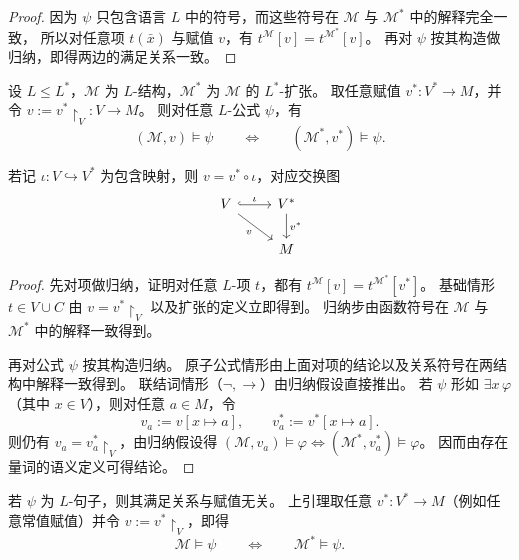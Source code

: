 \documentclass[lang=cn,a4paper,newtx,section]{elegantbook}
\begin{document}
 \begin{proof}
 因为 $\psi$ 只包含语言 $L$ 中的符号，而这些符号在 $\mathcal M$ 与 $\mathcal M^*$ 中的解释完全一致，
 所以对任意项 $t(\bar x)$ 与赋值 $v$，有 $t^{\mathcal M}[v]=t^{\mathcal M^*}[v]$。
 再对 $\psi$ 按其构造做归纳，即得两边的满足关系一致。
 \end{proof}

 \begin{lemma}
 设 $L\le L^*$，$\mathcal M$ 为 $L$-结构，$\mathcal M^*$ 为 $\mathcal M$ 的 $L^*$-扩张。
 取任意赋值 $v^*:V^*\to M$，并令 $v:=v^*\!\restriction_V:V\to M$。
 则对任意 $L$-公式 $\psi$，有
 \[
   (\mathcal M,v)\models\psi\qquad\Longleftrightarrow\qquad(\mathcal M^*,v^*)\models\psi.
 \]

 若记 $\iota:V\hookrightarrow V^*$ 为包含映射，则 $v=v^*\circ\iota$，对应交换图
 \[
 \begin{tikzcd}
 V \arrow[r, hook, "\iota"] \arrow[dr, "v"'] & V^* \arrow[d, "v^*"] \\
 & M
 \end{tikzcd}
 \]
 \end{lemma}

 \begin{proof}
 先对项做归纳，证明对任意 $L$-项 $t$，都有 $t^{\mathcal M}[v]=t^{\mathcal M^*}[v^*]$。
 基础情形 $t\in V\cup C$ 由 $v=v^*\!\restriction_V$ 以及扩张的定义立即得到。
 归纳步由函数符号在 $\mathcal M$ 与 $\mathcal M^*$ 中的解释一致得到。

 再对公式 $\psi$ 按其构造归纳。
 原子公式情形由上面对项的结论以及关系符号在两结构中解释一致得到。
 联结词情形（$\neg,\to$）由归纳假设直接推出。
 若 $\psi$ 形如 $\exists x\,\varphi$（其中 $x\in V$），则对任意 $a\in M$，令
 \[
   v_a:=v[x\mapsto a],\qquad v^*_a:=v^*[x\mapsto a].
 \]
 则仍有 $v_a=v^*_a\!\restriction_V$，由归纳假设得
 $(\mathcal M,v_a)\models\varphi\iff(\mathcal M^*,v^*_a)\models\varphi$。
 因而由存在量词的语义定义可得结论。
 \end{proof}

 \begin{remark}
 若 $\psi$ 为 $L$-句子，则其满足关系与赋值无关。
 上引理取任意 $v^*:V^*\to M$（例如任意常值赋值）并令 $v:=v^*\!\restriction_V$，即得
 \[
   \mathcal M\models\psi\qquad\Longleftrightarrow\qquad\mathcal M^*\models\psi.
 \]
 \end{remark}
\end{document}
